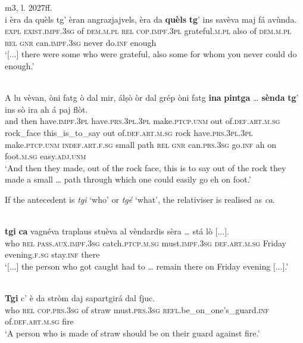 \ea
\label{relpreppar2}
 {m3, l. 2027ff.}\\
	\gll [...] i èra da quèls tg’ èran angrazjajvels, èra da \textbf{quèls} \textbf{tg}’ ins savèva maj fá avùnda.\\
 {} \textsc{expl} \textsc{\textbf{}exist.impf.3sg} of \textsc{dem.m.pl} \textsc{rel} \textsc{cop.impf.3pl} grateful.\textsc{m.pl} also of \textsc{dem.m.pl} \textsc{rel} \textsc{gnr} can.\textsc{impf.3sg} never do.\textsc{inf} enough\\
\glt `[...] there were some who were grateful, also some for whom you never could do enough.'
\z

\ea
\label{relpreptras}
\\
\gll  A lu vèvan, òni fatg ò dal mir, álṣò òr dal grép òni fatg \textbf{ina} \textbf{pintga} …  \textbf{sènda} \textbf{tg}’ ins sò ira ah á paj flòt.\\
and then have.\textsc{impf.3pl} have.\textsc{prs.3pl.3pl} make.\textsc{ptcp.unm} out of.\textsc{def.art.m.sg} rock\_face this\_is\_to\_say out of.\textsc{def.art.m.sg} rock have.\textsc{prs.3pl.3pl} make.\textsc{ptcp.unm} \textsc{indef.art.f.sg} small {} path \textsc{rel} \textsc{gnr} can.\textsc{prs.3sg} go.\textsc{inf} ah on foot.\textsc{m.sg} easy.\textsc{adj.unm} \\
\glt `And then they made, out of the rock face, this is to say out of the rock they made a small … path through which one could easily go eh on foot.'
\z

If the antecedent is \textit{tgi} `who' or \textit{tgé} `what', the relativiser is realised as \textit{ca}.

\ea\label{}
\\
\gll    [...] \textbf{tgi} \textbf{ca} vagnéva traplaus stuèva al vèndardis sèra … stá lò [...].\\
{}  who \textsc{rel} \textsc{pass.aux.impf.3sg} catch.\textsc{ptcp.m.sg} must.\textsc{impf.3sg} \textsc{def.art.m.sg} Friday evening.\textsc{f.sg} {} stay.\textsc{inf} there\\
\glt `[...] the person who got caught had to … remain there on Friday evening [...].'
\z

\ea\label{}
\\
\gll   \textbf{Tgi} {c}’ è da stròm daj sapartgirá dal fjuc.\\
     who \textsc{rel} \textsc{cop.prs.3sg} of straw must.\textsc{prs.3sg} \textsc{refl}.be\_on\_one’s\_guard.\textsc{inf} of.\textsc{def.art.m.sg} fire\\
\glt `A person who is made of straw should be on their guard against fire.'
\z

